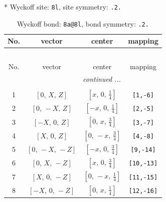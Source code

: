 \documentclass[fleqn,8pt]{jsarticle}
\begin{document}
* Wyckoff site: {\tt 8l}, site symmetry: {\tt .2.}
\renewcommand{\arraystretch}{1.2}
\begin{longtable}{cccc}
\caption{Wyckoff bond: {\tt 8a@8l}, bond symmetry: {\tt .2.}}
 \\
 \hline \hline
No. & vector & center & mapping \\ \hline \endfirsthead

\multicolumn{3}{l}{\tablename\ \thetable{}} \\
 \hline \hline
No. & vector & center & mapping \\ \hline \endhead

 \hline \hline
\multicolumn{3}{r}{\footnotesize\it continued ...} \\ \endfoot

 \hline \hline
\multicolumn{3}{r}{} \\ \endlastfoot

1 & $\left[ 0,\, X,\, Z \right]$ & $\left[ x,\, 0,\, \frac{1}{4} \right]$ & {\tt [1,-6]} \\ \hline
2 & $\left[ 0,\, - X,\, Z \right]$ & $\left[ - x,\, 0,\, \frac{1}{4} \right]$ & {\tt [2,-5]} \\ \hline
3 & $\left[ - X,\, 0,\, Z \right]$ & $\left[ 0,\, x,\, \frac{3}{4} \right]$ & {\tt [3,-7]} \\ \hline
4 & $\left[ X,\, 0,\, Z \right]$ & $\left[ 0,\, - x,\, \frac{3}{4} \right]$ & {\tt [4,-8]} \\ \hline
5 & $\left[ 0,\, - X,\, - Z \right]$ & $\left[ - x,\, 0,\, \frac{3}{4} \right]$ & {\tt [9,-14]} \\ \hline
6 & $\left[ 0,\, X,\, - Z \right]$ & $\left[ x,\, 0,\, \frac{3}{4} \right]$ & {\tt [10,-13]} \\ \hline
7 & $\left[ X,\, 0,\, - Z \right]$ & $\left[ 0,\, - x,\, \frac{1}{4} \right]$ & {\tt [11,-15]} \\ \hline
8 & $\left[ - X,\, 0,\, - Z \right]$ & $\left[ 0,\, x,\, \frac{1}{4} \right]$ & {\tt [12,-16]} \\
\end{longtable}
\renewcommand{\arraystretch}{1.2}
\end{document}
